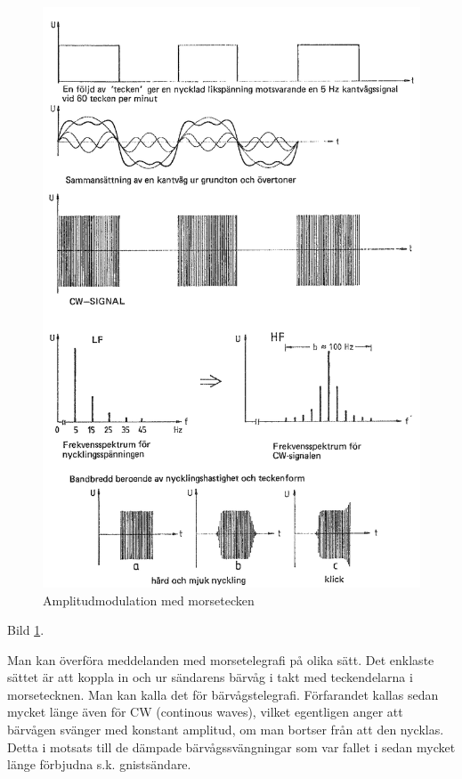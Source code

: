 \begin{figure}
\includegraphics[width=\textwidth]{images/cropped_pdfs/bild_2_1-26.pdf}
\caption{Amplitudmodulation med morsetecken}
\label{fig:BildII1-26}
\end{figure}

Bild \ref{fig:BildII1-26}.

Man kan överföra meddelanden med morsetelegrafi på olika sätt. Det enklaste
sättet är att koppla in och ur sändarens bärvåg i takt med teckendelarna i
morsetecknen. Man kan kalla det för bärvågstelegrafi. Förfarandet kallas sedan
mycket länge även för CW (continous waves), vilket egentligen anger att
bärvågen svänger med konstant amplitud, om man bortser från att den nycklas.
Detta i motsats till de dämpade bärvågssvängningar som var fallet i sedan
mycket länge förbjudna s.k. gnistsändare.

